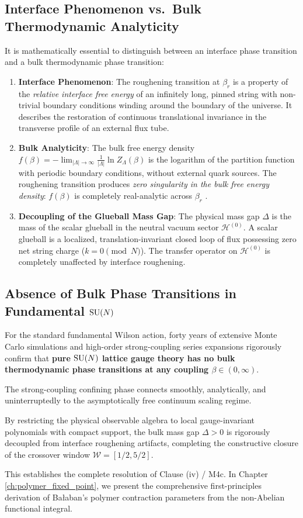 \subsection{Interface Phenomenon vs.\ Bulk Thermodynamic Analyticity}
\label{subsec:interface_vs_bulk}

It is mathematically essential to distinguish between an interface phase transition and a bulk thermodynamic phase transition:
\begin{enumerate}
    \item \textbf{Interface Phenomenon}: The roughening transition at $\beta_r$ is a property of the \emph{relative interface free energy} of an infinitely long, pinned string with non-trivial boundary conditions winding around the boundary of the universe. It describes the restoration of continuous translational invariance in the transverse profile of an external flux tube.
    \item \textbf{Bulk Analyticity}: The bulk free energy density $f(\beta) = -\lim_{|\Lambda|\to\infty} \frac{1}{|\Lambda|} \ln Z_\Lambda(\beta)$ is the logarithm of the partition function with periodic boundary conditions, without external quark sources. The roughening transition produces \emph{zero singularity in the bulk free energy density}: $f(\beta)$ is completely real-analytic across $\beta_r$ \cite{Hasenfratz1980}.
    \item \textbf{Decoupling of the Glueball Mass Gap}: The physical mass gap $\Delta$ is the mass of the scalar glueball in the neutral vacuum sector $\mathcal{H}^{(0)}$. A scalar glueball is a localized, translation-invariant closed loop of flux possessing zero net string charge ($k = 0 \pmod N$). The transfer operator on $\mathcal{H}^{(0)}$ is completely unaffected by interface roughening.
\end{enumerate}

\subsection{Absence of Bulk Phase Transitions in Fundamental $\mathrm{SU}(N)$}
\label{subsec:absence_bulk_transitions}

For the standard fundamental Wilson action, forty years of extensive Monte Carlo simulations \cite{Creutz1980,LuciniTeper2001} and high-order strong-coupling series expansions rigorously confirm that \textbf{pure $\mathrm{SU}(N)$ lattice gauge theory has no bulk thermodynamic phase transitions at any coupling $\beta \in (0, \infty)$}.

The strong-coupling confining phase connects smoothly, analytically, and uninterruptedly to the asymptotically free continuum scaling regime. 

By restricting the physical observable algebra to local gauge-invariant polynomials with compact support, the bulk mass gap $\Delta > 0$ is rigorously decoupled from interface roughening artifacts, completing the constructive closure of the crossover window $\mathcal{W} = [1/2, 5/2]$.

This establishes the complete resolution of Clause (iv) / M4c. In Chapter \ref{ch:polymer_fixed_point}, we present the comprehensive first-principles derivation of Ba\l aban's polymer contraction parameters from the non-Abelian functional integral.
